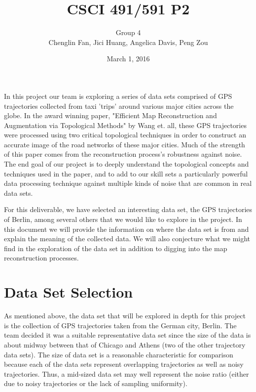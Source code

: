 \documentclass[11pt]{article}
\title{CSCI 491/591 P2}
\date{March 1, 2016}
\author{Group 4\\Chenglin Fan, Jici Huang,
Angelica Davis, Peng Zou}
\begin{document}
\maketitle
\noindent
In this project our team is exploring a series of data sets comprised of GPS trajectories collected from taxi 'trips' around various major cities across the globe. In the award winning paper, "Efficient Map Reconstruction and Augmentation via Topological Methods" by Wang et. all, these GPS trajectories were processed using two critical topological techniques in order to construct an accurate image of the road networks of these major cities. Much of the strength of this paper comes from the reconstruction process's robustness against noise. The end goal of our project is to deeply understand the topological concepts and techniques used in the paper, and to add to our skill sets a particularly powerful data processing technique against multiple kinds of noise that are common in real data sets. 

For this deliverable, we have selected an interesting data set, the GPS trajectories of Berlin, among several others that we would like to explore in the project. In this document we will provide the information on where the data set is from and explain the meaning of the collected data. We will also conjecture what we might find in the exploration of the data set in addition to digging into the map reconstruction processes.
\section*{Data Set Selection}
As mentioned above, the data set that will be explored in depth for this project is the collection of GPS trajectories taken from the German city, Berlin.
The team decided it was a suitable representative data set since the size of the data is about midway between that of Chicago and Athens (two of the other trajectory data sets). The size of data set is a reasonable characteristic for comparison because each of the data sets represent overlapping trajectories as well as noisy trajectories. Thus, a mid-sized data set may well represent the noise ratio (either due to noisy trajectories or the lack of sampling uniformity). %
\end{document}
